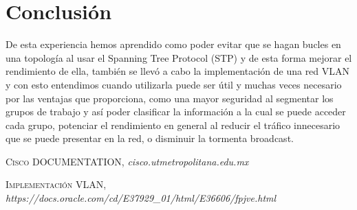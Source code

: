 \documentclass{udpreport}
\begin{document}
\chapter{Conclusión}
 De esta experiencia hemos aprendido como poder evitar que se hagan bucles en una topología al usar el Spanning Tree Protocol (STP) y de esta forma mejorar el rendimiento de ella, también se llevó a cabo la implementación de una red VLAN y con esto entendimos cuando utilizarla puede ser útil y muchas veces necesario por las ventajas que proporciona, como una mayor seguridad al segmentar los grupos de trabajo y así poder clasificar la información a la cual se puede acceder cada grupo, potenciar el rendimiento en general al reducir el tráfico innecesario que se puede presentar en la red, o disminuir la tormenta broadcast.\\
\begin{thebibliography}{x}
 \textsc{Cisco DOCUMENTATION},
\textit{cisco.utmetropolitana.edu.mx}

 \textsc{Implementación VLAN},
\textit{https://docs.oracle.com/cd/E37929_01/html/E36606/fpjve.html}

\end{thebibliography}
\end{document}
